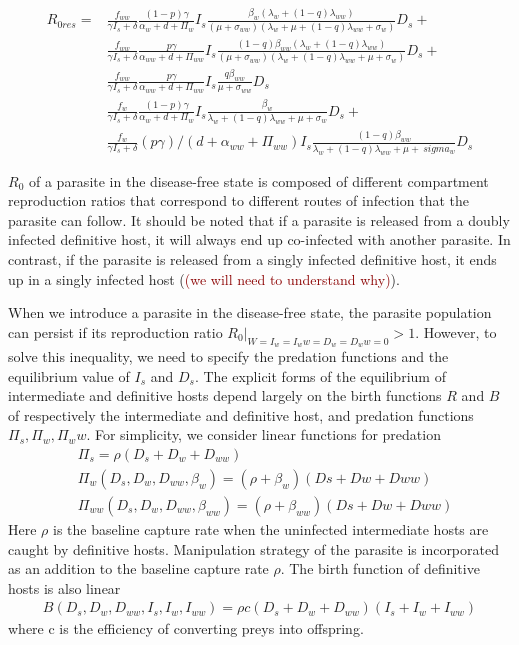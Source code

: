 \documentclass{article}
\newcommand{\phg}[1]{\textcolor{darkred}{(#1)}}
\begin{document}
\begin{align}
R_{0res} = & \frac{f_{ww}}{\gamma  I_s + \delta } \frac{(1-p) \gamma}{\alpha_w + d + \Pi_w} I_s \frac{\beta_w (\lambda_w +  (1-q)\lambda_{ww})}{(\mu + \sigma_{ww}) (\lambda_w + \mu + (1-q) \lambda_{ww} + \sigma_w)} D_s + \nonumber \\ 
           & \frac{f_{ww}}{\gamma  I_s + \delta }  \frac{p \gamma}{\alpha_{ww} + d + \Pi_{ww}} I_s  \frac{(1-q) \beta_{ww} (\lambda_w +(1-q) \lambda_{ww})}{(\mu +\sigma_{ww}) (\lambda_w + (1-q) \lambda_{ww} + \mu + \sigma_w)} D_s + \nonumber \\
           & \frac{f_{ww}}{\gamma  I_s + \delta }  \frac{p \gamma}{\alpha_{ww} + d + \Pi_{ww}} I_s  \frac{q \beta_{ww}}{\mu +\sigma_{ww}} D_s  \\
           & \frac{f_w}{\gamma  I_s + \delta }  \frac{(1-p) \gamma}{\alpha_w + d + \Pi_w} I_s  \frac{\beta_w}{\lambda_w + (1-q)\lambda_{ww} +\mu + \sigma_w} D_s + \nonumber \\
           & \frac{f_w}{\gamma  I_s + \delta } (p \gamma)/(d + \alpha_{ww} + \Pi_{ww}) I_s \frac{(1-q) \beta_{ww}}{\lambda_w + (1-q) \lambda_{ww} + \mu +\ sigma_w} D_s \nonumber
\end{align}

$R_0$ of a parasite in the disease-free state is composed of different compartment reproduction ratios that correspond to different routes of infection that the parasite can follow. It should be noted that if a parasite is released from a doubly infected definitive host, it will always end up co-infected with another parasite. In contrast, if the parasite is released from a singly infected definitive host, it ends up in a singly infected host (\phg{we will need to understand why}).

When we introduce a parasite in the disease-free state, the parasite population can persist if its reproduction ratio $R_0|_{W = I_w = I_ww = D_w = D_ww = 0} > 1$. However, to solve this inequality, we need to specify the predation functions and the equilibrium value of $I_s$ and $D_s$. The explicit forms of the equilibrium of intermediate and definitive hosts depend largely on the birth functions $R$ and $B$ of respectively the intermediate and definitive host, and predation functions $\Pi_s, \Pi_w, \Pi_ww$. For simplicity, we consider linear functions for predation 
\begin{align*}
& \Pi_s = \rho (D_s + D_w + D_{ww}) \\
& \Pi_w(D_s, D_w, D_{ww}, \beta_w) = (\rho + \beta_w) (Ds + Dw + Dww) \\
& \Pi_{ww}(D_s, D_w, D_{ww}, \beta_{ww}) = (\rho + \beta_{ww}) (Ds + Dw + Dww)
\end{align*}
Here $\rho$ is the baseline capture rate when the uninfected intermediate hosts are caught by definitive hosts. Manipulation strategy of the parasite is incorporated as an addition to the baseline capture rate $\rho$. The birth function of definitive hosts is also linear
\begin{align*}
B(D_s, D_w, D_{ww}, I_s, I_w, I_{ww}) = \rho c (D_s + D_w + D_{ww}) (I_s + I_w + I_{ww})
\end{align*}
where c is the efficiency of converting preys into offspring.
\end{document}
